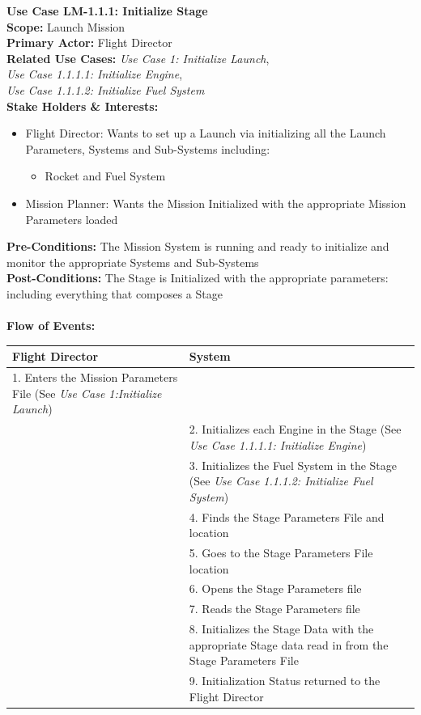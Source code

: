 \documentclass[letterpaper]{article}
\begin{document}
\noindent
\textbf{Use Case LM-1.1.1:  Initialize Stage}\\
\textbf{Scope: }Launch Mission\\
\textbf{Primary Actor: }Flight Director\\
\textbf{Related Use Cases:  }\textit{Use Case 1: Initialize Launch},\\
\textit{Use Case 1.1.1.1:  Initialize Engine},\\
\textit{Use Case 1.1.1.2:  Initialize Fuel System}\\
\textbf{Stake Holders  \& Interests:}
\begin{itemize}
   \item Flight Director:  Wants to set up a Launch via initializing
      all the Launch Parameters, Systems and Sub-Systems including:
      \begin{itemize}
         \item Rocket and Fuel System
      \end{itemize}
   \item Mission Planner: Wants the Mission Initialized with the 
      appropriate Mission Parameters loaded
\end{itemize}
\textbf{Pre-Conditions:  }The Mission System is running and ready to
initialize and monitor the appropriate Systems and Sub-Systems\\
\textbf{Post-Conditions: }The Stage is Initialized with the 
appropriate parameters:  including everything that composes a 
Stage\\\\
\textbf{Flow of Events:}\\
\begin{tabular}{|p{5.75cm}|p{5.75cm}|}\hline
   \textbf{Flight Director}&\textbf{System}\\\hline
   1.  Enters the Mission Parameters File (See 
   \textit{Use Case 1:Initialize Launch})&\\\hline
   &2. Initializes each Engine in the Stage (See 
   \textit{Use Case 1.1.1.1: Initialize Engine})\\\hline
   &3. Initializes the Fuel System in the Stage (See 
   \textit{Use Case 1.1.1.2: Initialize Fuel System})\\\hline	
   &4. Finds the Stage Parameters File and location\\\hline
   &5. Goes to the Stage Parameters File location\\\hline
   &6. Opens the Stage Parameters file\\\hline
   &7. Reads the Stage Parameters file\\\hline
   &8. Initializes the Stage Data with the appropriate Stage data 
   read in from the Stage Parameters File\\\hline
   &9. Initialization Status returned to the Flight Director\\\hline
\end{tabular}\\\\
\end{document}
